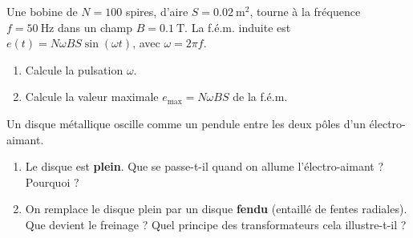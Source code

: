 \documentclass[11pt,a4paper]{article}
\newcommand{\vv}[1]{\vec{#1}}\newcommand{\ds}{\displaystyle}
\begin{document}
\begin{exo}
Une bobine de $N=100$ spires, d'aire $S=\qty{0.02}{\metre\squared}$, tourne à la fréquence
$f=\qty{50}{\hertz}$ dans un champ $B=\qty{0.1}{\tesla}$. La f.é.m. induite est
$e(t)=N\omega BS\sin(\omega t)$, avec $\omega=2\pi f$.
\begin{enumerate}[label=\alph*)]
  \item Calcule la pulsation $\omega$.
  \item Calcule la valeur maximale $e_{\max}=N\omega BS$ de la f.é.m.
\end{enumerate}
\end{exo}

\begin{exo}
Un disque métallique oscille comme un pendule entre les deux pôles d'un électro-aimant.
\begin{center}
\end{center}
\begin{enumerate}[label=\alph*)]
  \item Le disque est \textbf{plein}. Que se passe-t-il quand on allume l'électro-aimant ? Pourquoi ?
  \item On remplace le disque plein par un disque \textbf{fendu} (entaillé de fentes radiales). Que
        devient le freinage ? Quel principe des transformateurs cela illustre-t-il ?
\end{enumerate}
\end{exo}
\end{document}
